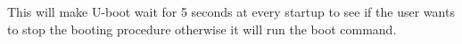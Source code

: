 \documentclass[11pt
  , a4paper
  , article
  , oneside
  , showtrims
]{memoir}
\begin{document}
This will make U-boot wait for 5 seconds at every startup to see if the user wants to stop the booting procedure otherwise it will run the boot command.



\clearpage
\backmatter
%
%
%

%

\end{document}
